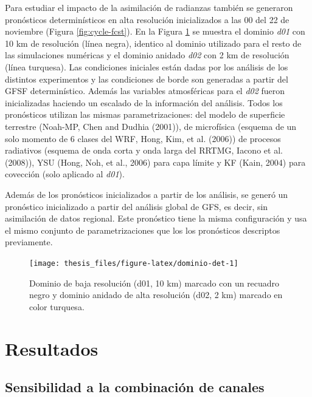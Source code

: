 \documentclass[12pt,oneside,a4paper]{reedthesis}
\begin{document}
Para estudiar el impacto de la asimilación de radianzas también se generaron pronósticos determinísticos en alta resolución inicializados a las 00 del 22 de noviembre (Figura \ref{fig:cycle-fcst}). En la Figura \ref{fig:dominio-det} se muestra el dominio \emph{d01} con 10 km de resolución (línea negra), identico al dominio utilizado para el resto de las simulaciones numéricas y el dominio anidado \emph{d02} con 2 km de resolución (línea turquesa). Las condiciones iniciales están dadas por los análisis de los distintos experimentos y las condiciones de borde son generadas a partir del GFSF determinístico. Además las variables atmosféricas para el \emph{d02} fueron inicializadas haciendo un escalado de la información del análisis. Todos los pronósticos utilizan las mismas parametrizaciones: del modelo de superficie terrestre (Noah-MP, Chen and Dudhia (2001)), de microfísica (esquema de un solo momento de 6 clases del WRF, Hong, Kim, et al. (2006)) de procesos radiativos (esquema de onda corta y onda larga del RRTMG, Iacono et al. (2008)), YSU (Hong, Noh, et al., 2006) para capa límite y KF (Kain, 2004) para covección (solo aplicado al \emph{d01}).

Además de los pronósticos inicializados a partir de los análisis, se generó un pronóstico inicializado a partir del análisis global de GFS, es decir, sin asimilación de datos regional. Este pronóstico tiene la misma configuración y usa el mismo conjunto de parametrizaciones que los los pronósticos descriptos previamente.


\begin{figure}

{\centering \texttt{[image: thesis\_files/figure-latex/dominio-det-1]} 

}

\caption{Dominio de baja resolución (d01, 10 km) marcado con un recuadro negro y dominio anidado de alta resolución (d02, 2 km) marcado en color turquesa.}\label{fig:dominio-det}
\end{figure}
\hypertarget{resultados-2}{%
\section{Resultados}\label{resultados-2}}

\hypertarget{canales}{%
\subsection{Sensibilidad a la combinación de canales}\label{canales}}
\end{document}
